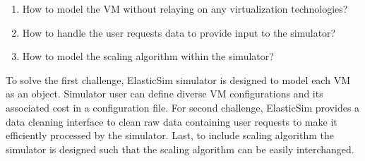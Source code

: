  \begin{enumerate}
   \item How to model the VM without relaying on any virtualization technologies?
   \item How to handle the user requests data to provide input to the simulator?
   \item How to model the scaling algorithm within the simulator?
 \end{enumerate}

 To solve the first challenge, ElasticSim simulator is designed to model each VM as an object. Simulator user can define diverse VM configurations and its associated cost in a configuration file. For second challenge, ElasticSim provides a data cleaning interface to clean raw data containing user requests to make it efficiently processed by the simulator. Last, to include scaling algorithm the simulator is designed such that the scaling algorithm can be easily interchanged.

